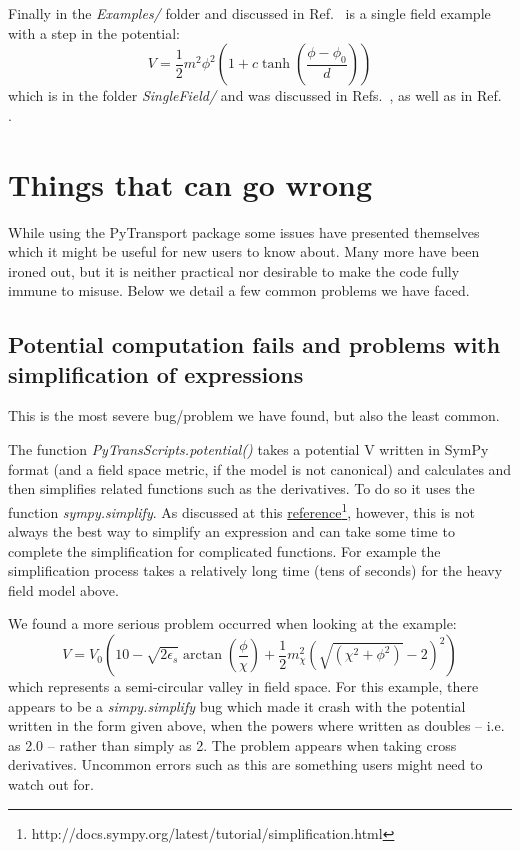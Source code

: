 \documentclass[10pt,
amsmath,amssymb,
aps,prd,nofootinbib,eqsecnum,a4paper]{revtex4}
\def\be{\begin{equation}}
\def\ee{\end{equation}}
\begin{document}
Finally in the {\it Examples/} folder and discussed in  Ref.~\cite{Dias:2016rjq} is a single field example with a step in the potential:
\be
V = \frac{1}{2} m^2 \phi^2 \left (1+c \tanh\left(\frac{\phi-\phi_0}{d} \right)\right)
\ee
which is in the folder {\it SingleField/} and was discussed in Refs.~\cite{Chen:2006xjb,Chen:2008wn}, as well as in Ref.~\cite{Dias:2016rjq} .


\section{Things that can go wrong}

While using the PyTransport package some issues have presented themselves which it might be useful 
for new users to know about. Many more have been ironed out, but it is neither practical nor desirable to make the code 
fully immune to misuse. Below we detail a few common problems we have faced. 


\subsection{Potential computation fails and problems with simplification of expressions}
\label{pcf}
This is the most severe bug/problem we have found, but also the least common. 

The function {\it PyTransScripts.potential()} takes a potential V written in SymPy format (and a field 
space metric, if the model is not canonical) and 
calculates and then simplifies related functions such as the derivatives. To do so it uses the function {\it sympy.simplify}. 
As discussed at 
this \href{http://docs.sympy.org/latest/tutorial/simplification.html}{reference}\footnote{http://docs.sympy.org/latest/tutorial/simplification.html}, however, this is not always 
the best way to simplify an expression and can take some time to complete the simplification 
for complicated functions. For example the simplification process takes a relatively long time (tens of seconds) for the heavy 
field model 
above.

We found a more serious problem occurred when looking at the example:
\be
V = V_0 \left (10 - \sqrt {2 \epsilon_s} \arctan \left ( \frac{\phi}{\chi} \right ) +    \frac{1}{2} m_\chi^2 
\left ( \sqrt {\left (\chi^2 + \phi^2 \right )} - 2 \right )^2 \right)
\ee
which represents a semi-circular valley in field space.
For this example, there appears to be a 
{\it simpy.simplify} bug which made it crash with 
the potential written in the form given above, when the powers where written as doubles -- i.e. as 2.0 -- rather than simply as 
2. The problem appears when taking cross derivatives. 
Uncommon errors such as this are something users might need to watch out for. 
\end{document}

